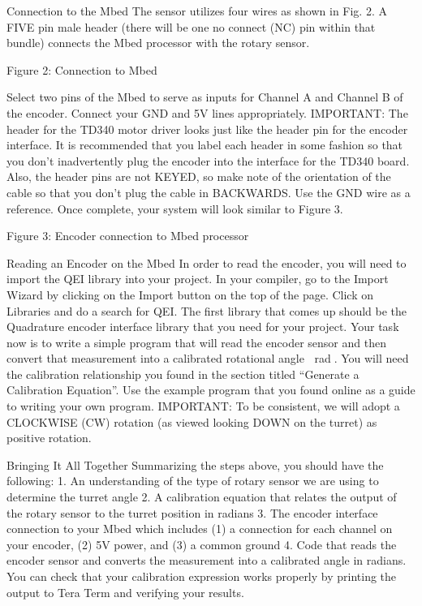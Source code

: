 \documentclass{tufte-handout}
\begin{document}
Connection to the Mbed
The sensor utilizes four wires as shown in Fig. 2. A FIVE pin male header (there will be one no connect (NC) pin within that bundle) connects the Mbed processor with the rotary sensor. 

                          
                                                  Figure 2: Connection to Mbed 

Select two pins of the Mbed to serve as inputs for Channel A and Channel B of the encoder. Connect your GND and 5V lines appropriately. 
IMPORTANT: The header for the TD340 motor driver looks just like the header pin for the encoder interface. It is recommended that you label each header in some fashion so that you don’t inadvertently plug the encoder into the interface for the TD340 board. 
Also, the header pins are not KEYED, so make note of the orientation of the cable so that you don’t plug the cable in BACKWARDS. Use the GND wire as a reference. 
Once complete, your system will look similar to Figure 3. 
               
                                               Figure 3: Encoder connection to Mbed processor 



                                                              
Reading an Encoder on the Mbed
In order to read the encoder, you will need to import the QEI library into your project. In your compiler, go to the Import Wizard by clicking on the Import button on the top of the page.  Click on Libraries and do a search for QEI.  The first library that comes up should be the Quadrature encoder interface library that you need for your project.  
Your task now is to write a simple program that will read the encoder sensor and then convert that measurement into a calibrated rotational angle rad. You will need the calibration relationship you found in the section titled “Generate a Calibration Equation”.  Use the example program that you found online as a guide to writing your own program.
IMPORTANT: To be consistent, we will adopt a CLOCKWISE (CW) rotation (as viewed looking DOWN on the turret) as positive rotation. 
                                                 
Bringing It All Together
Summarizing the steps above, you should have the following:
    1. An understanding of the type of rotary sensor we are using to determine the turret angle
    2. A calibration equation that relates the output of the rotary sensor to the turret position in radians
    3. The encoder interface connection to your Mbed which includes (1) a connection for each channel on your encoder, (2) 5V power, and (3) a common ground
    4. Code that reads the encoder sensor and converts the measurement into a calibrated angle in radians. You can check that your calibration expression works properly by printing the output to Tera Term and verifying your results.
\end{document}
